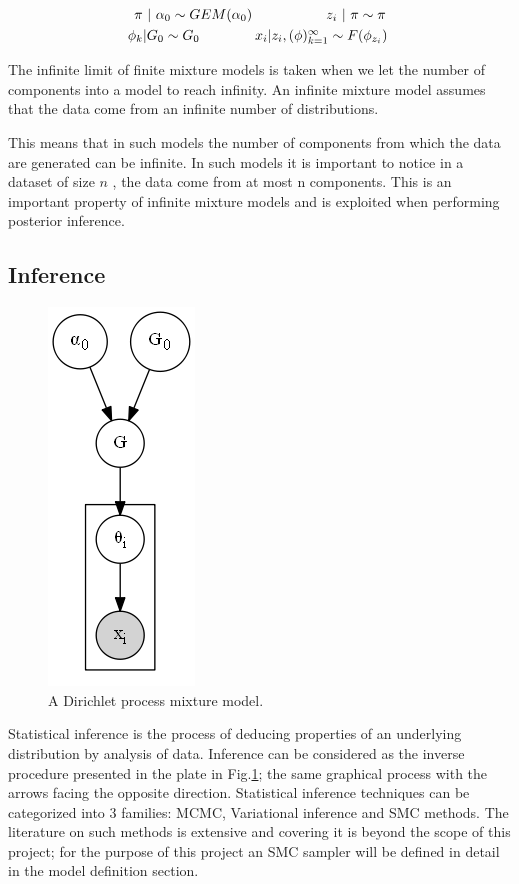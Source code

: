\documentclass[twoside,hidelinks]{article}
\begin{document}
	\begin{equation}
		\begin{aligned}
			\centerline{ \textbf{$\pi$} $|$  $ \alpha_0  \sim GEM(\alpha_0 )\ \ \ \ \ \ \ \ \ \ \ \ \ \ \ \   z_i$ $|$ \textbf{$ \pi \sim \pi  $} } \\
			\centerline{$ \phi_k | G_0 \sim G_0 $\ \ \ \ \ \ \ \ \ \ \ \ $x_i | z_i, (\phi )_{k=1}^\infty \sim F(\phi_{z_i}) $  } \\
		\end{aligned}
	\end{equation}

The infinite limit of finite mixture models is taken when we let the number of components into a model to reach infinity. An infinite mixture model assumes that the data come from an infinite number of distributions.

This means that in such models the number of components from which the data are generated can be infinite. In such models it is important to notice in a dataset of size $n$ , the data come from at most n components. This is an important property of infinite mixture models and is exploited when performing posterior inference.

\subsection{Inference}
\begin{figure}
          \centerline{\includegraphics[width=.17\textwidth]{dpmm3}}
	\caption{A Dirichlet process mixture model.}
	\label{mm}
\end{figure}


Statistical inference is the process of deducing properties of an underlying distribution by analysis of data. Inference can be considered as the inverse procedure presented in the plate in Fig.\ref{mm}; the same graphical process with the arrows facing the opposite direction. Statistical inference techniques can be categorized into 3 families: MCMC, Variational inference and SMC methods. The literature on such methods is extensive and covering it is beyond the scope of this project; for the purpose of this project an SMC sampler will be defined in detail in the model definition section. 
\end{document}
